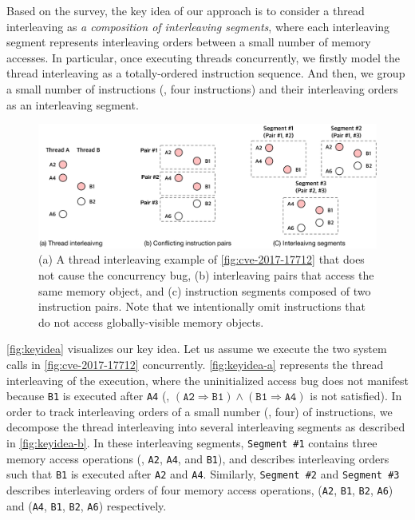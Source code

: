 %
Based on the survey, the key idea of our approach is to consider a
thread interleaving as \textit{a composition of interleaving
  segments}, where each interleaving segment represents interleaving
orders between a small number of memory accesses.
%
In particular, once executing threads concurrently, we firstly model
the thread interleaving as a totally-ordered instruction sequence.
%
And then, we group a small number of instructions (\eg, four
instructions) and their interleaving orders as an interleaving segment.


\begin{figure}[t]
  \centering
  \includegraphics[width=0.9\linewidth]{fig/intuition.pdf}
  \caption{(a) A thread interleaving example of
    \autoref{fig:cve-2017-17712} that does not cause the concurrency
    bug, (b) interleaving pairs that access the same memory object,
    and (c) instruction segments composed of two instruction pairs.
    Note that we intentionally omit instructions that do not access
    globally-visible memory objects.}
  \label{fig:keyidea}
\end{figure}
%
\autoref{fig:keyidea} visualizes our key idea.
%
Let us assume we execute the two system calls in
\autoref{fig:cve-2017-17712} concurrently.
%
\autoref{fig:keyidea-a} represents the thread interleaving of the
execution, where the uninitialized access bug does not manifest
because \texttt{B1} is executed after \texttt{A4} (\ie,
$(\texttt{A2} \Rightarrow \texttt{B1}) \wedge (\texttt{B1} \Rightarrow
\texttt{A4})$ is not satisfied).
%
In order to track interleaving orders of a small number (\eg, four) of
instructions, we decompose the thread interleaving into several
interleaving segments as described in \autoref{fig:keyidea-b}.
%
In these interleaving segments, \texttt{Segment \#1} contains three
memory access operations (\ie, \texttt{A2}, \texttt{A4}, and
\texttt{B1}), and describes interleaving orders such that \texttt{B1}
is executed after \texttt{A2} and \texttt{A4}.
%
Similarly, \texttt{Segment \#2} and \texttt{Segment \#3} describes
interleaving orders of four memory access operations, (\texttt{A2},
\texttt{B1}, \texttt{B2}, \texttt{A6}) and (\texttt{A4}, \texttt{B1},
\texttt{B2}, \texttt{A6}) respectively.
%

